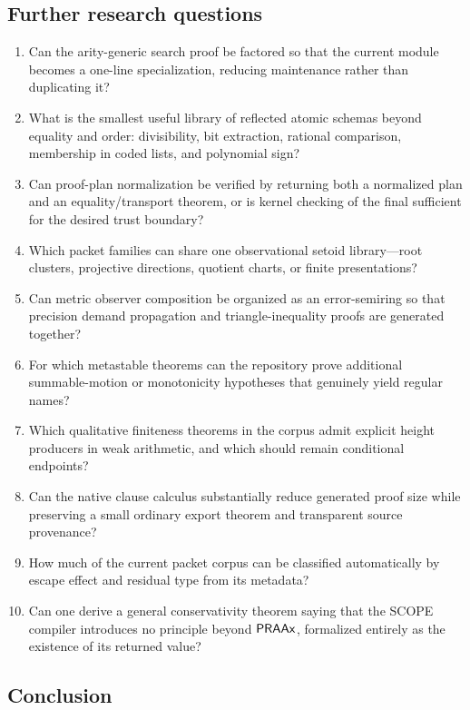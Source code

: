 \subsection{Further research questions}

\begin{enumerate}[label=\textbf{Q\arabic*.}]
\item Can the arity-generic search proof be factored so that the current
   module becomes a one-line specialization, reducing maintenance
  rather than duplicating it?
\item What is the smallest useful library of reflected atomic schemas beyond
  equality and order: divisibility, bit extraction, rational comparison,
  membership in coded lists, and polynomial sign?
\item Can proof-plan normalization be verified by returning both a normalized
  plan and an equality/transport theorem, or is kernel checking of the final
   sufficient for the desired trust boundary?
\item Which packet families can share one observational setoid library---root
  clusters, projective directions, quotient charts, or finite presentations?
\item Can metric observer composition be organized as an error-semiring so that
  precision demand propagation and triangle-inequality proofs are generated
  together?
\item For which metastable theorems can the repository prove additional
  summable-motion or monotonicity hypotheses that genuinely yield regular
  names?
\item Which qualitative finiteness theorems in the corpus admit explicit height
  producers in weak arithmetic, and which should remain conditional endpoints?
\item Can the native clause calculus substantially reduce generated proof size
  while preserving a small ordinary export theorem and transparent source
  provenance?
\item How much of the current packet corpus can be classified automatically by
  escape effect and residual type from its metadata?
\item Can one derive a general conservativity theorem saying that the SCOPE
  compiler introduces no principle beyond \(\mathsf{PRAAx}\), formalized entirely as
  the existence of its returned  value?
\end{enumerate}

\subsection{Conclusion}

